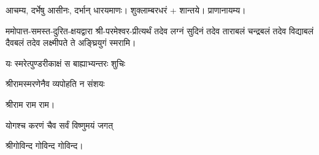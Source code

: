 


आचम्य, दर्भेषु आसीनः, दर्भान् धारयमाणः। शुक्लाम्बरधरं + शान्तये। प्राणानायम्य। 

ममोपात्त-समस्त-दुरित-क्षयद्वारा श्री-परमेश्वर-प्रीत्यर्थं   तदेव लग्नं सुदिनं तदेव ताराबलं चन्द्रबलं तदेव विद्याबलं दैवबलं तदेव लक्ष्मीपते ते अङ्घ्रियुगं स्मरामि।

{यः स्मरेत्पुण्डरीकाक्षं स बाह्याभ्यन्तरः शुचिः}

{श्रीरामस्मरणेनैव व्यपोहति न संशयः }

श्रीराम राम राम। 

{योगश्च करणं चैव सर्वं विष्णुमयं जगत्}

श्रीगोविन्द गोविन्द गोविन्द। 

